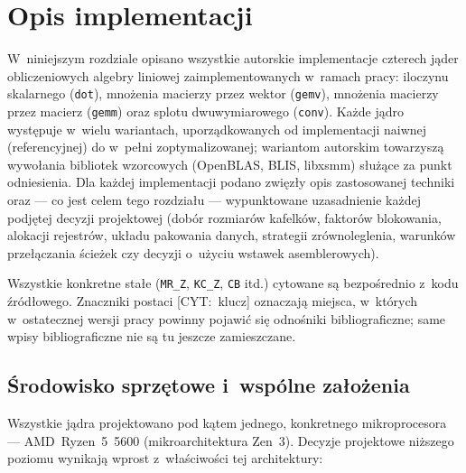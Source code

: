 \documentclass[a4paper,12pt]{book} %
\newcommand{\kod}[1]{\texttt{#1}}
\begin{document}
\tableofcontents{}

\chapter{Opis implementacji}
\label{ch:opis-implementacji}

W~niniejszym rozdziale opisano wszystkie autorskie implementacje czterech jąder
obliczeniowych algebry liniowej zaimplementowanych w~ramach pracy: iloczynu
skalarnego (\kod{dot}), mnożenia macierzy przez wektor (\kod{gemv}), mnożenia
macierzy przez macierz (\kod{gemm}) oraz splotu dwuwymiarowego (\kod{conv}).
Każde jądro występuje w~wielu wariantach, uporządkowanych od implementacji
naiwnej (referencyjnej) do w~pełni zoptymalizowanej; wariantom autorskim
towarzyszą wywołania bibliotek wzorcowych (OpenBLAS, BLIS, libxsmm) służące za
punkt odniesienia. Dla każdej implementacji podano zwięzły opis zastosowanej
techniki oraz --- co jest celem tego rozdziału --- wypunktowane uzasadnienie
każdej podjętej decyzji projektowej (dobór rozmiarów kafelków, faktorów
blokowania, alokacji rejestrów, układu pakowania danych, strategii
zrównoleglenia, warunków przełączania ścieżek czy decyzji o~użyciu wstawek
asemblerowych).

Wszystkie konkretne stałe (\kod{MR\_Z}, \kod{KC\_Z}, \kod{CB} itd.) cytowane są
bezpośrednio z~kodu źródłowego. Znaczniki postaci [CYT:~klucz] oznaczają miejsca,
w~których w~ostatecznej wersji pracy powinny pojawić się odnośniki
bibliograficzne; same wpisy bibliograficzne nie są tu jeszcze zamieszczane.

\section{Środowisko sprzętowe i~wspólne założenia}
\label{sec:srodowisko}

Wszystkie jądra projektowano pod kątem jednego, konkretnego mikroprocesora ---
AMD~Ryzen~5~5600 (mikroarchitektura Zen~3). Decyzje projektowe niższego poziomu
wynikają wprost z~właściwości tej architektury:
\end{document}
